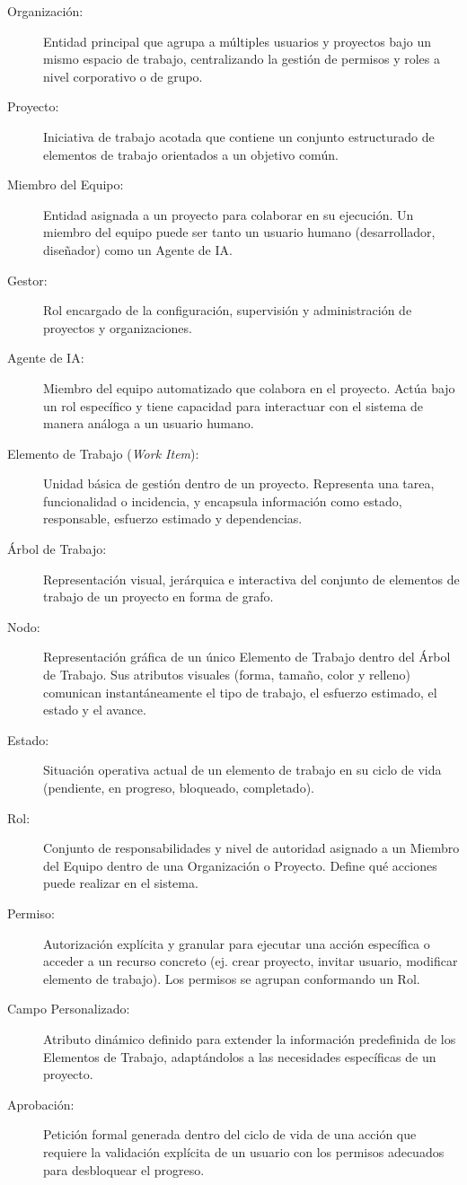 \begin{description}
    \item[Organización:] Entidad principal que agrupa a múltiples usuarios y proyectos bajo un mismo espacio de trabajo, centralizando la gestión de permisos y roles a nivel corporativo o de grupo.
    \item[Proyecto:] Iniciativa de trabajo acotada que contiene un conjunto estructurado de elementos de trabajo orientados a un objetivo común.
    \item[Miembro del Equipo:] Entidad asignada a un proyecto para colaborar en su ejecución. Un miembro del equipo puede ser tanto un usuario humano (desarrollador, diseñador) como un Agente de \ac{IA}.
    \item[Gestor:] Rol encargado de la configuración, supervisión y administración de proyectos y organizaciones.
    \item[Agente de \ac{IA}:] Miembro del equipo automatizado que colabora en el proyecto. Actúa bajo un rol específico y tiene capacidad para interactuar con el sistema de manera análoga a un usuario humano.
    \item[Elemento de Trabajo (\emph{Work Item}):] Unidad básica de gestión dentro de un proyecto. Representa una tarea, funcionalidad o incidencia, y encapsula información como estado, responsable, esfuerzo estimado y dependencias.
    \item[Árbol de Trabajo:] Representación visual, jerárquica e interactiva del conjunto de elementos de trabajo de un proyecto en forma de grafo.
    \item[Nodo:] Representación gráfica de un único Elemento de Trabajo dentro del Árbol de Trabajo. Sus atributos visuales (forma, tamaño, color y relleno) comunican instantáneamente el tipo de trabajo, el esfuerzo estimado, el estado y el avance.
    \item[Estado:] Situación operativa actual de un elemento de trabajo en su ciclo de vida (pendiente, en progreso, bloqueado, completado).
    \item[Rol:] Conjunto de responsabilidades y nivel de autoridad asignado a un Miembro del Equipo  dentro de una Organización o Proyecto. Define qué acciones puede realizar en el sistema.
    \item[Permiso:] Autorización explícita y granular para ejecutar una acción específica o acceder a un recurso concreto (ej. crear proyecto, invitar usuario, modificar elemento de trabajo). Los permisos se agrupan conformando un Rol.
    \item[Campo Personalizado:] Atributo dinámico definido para extender la información predefinida de los Elementos de Trabajo, adaptándolos a las necesidades específicas de un proyecto.
    \item[Aprobación:] Petición formal generada dentro del ciclo de vida de una acción que requiere la validación explícita de un usuario con los permisos adecuados para desbloquear el progreso.
\end{description}

